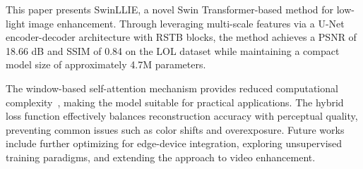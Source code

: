 \documentclass[conference]{IEEEtran}
\begin{document}
This paper presents SwinLLIE, a novel Swin Transformer-based method for low-light image enhancement. Through leveraging multi-scale features via a U-Net encoder-decoder architecture with RSTB blocks, the method achieves a PSNR of 18.66 dB and SSIM of 0.84 on the LOL dataset while maintaining a compact model size of approximately 4.7M parameters. 

The window-based self-attention mechanism provides reduced computational complexity~\cite{liu2021swin}, making the model suitable for practical applications. The hybrid loss function effectively balances reconstruction accuracy with perceptual quality, preventing common issues such as color shifts and overexposure. Future works include further optimizing for edge-device integration, exploring unsupervised training paradigms, and extending the approach to video enhancement.
\end{document}
